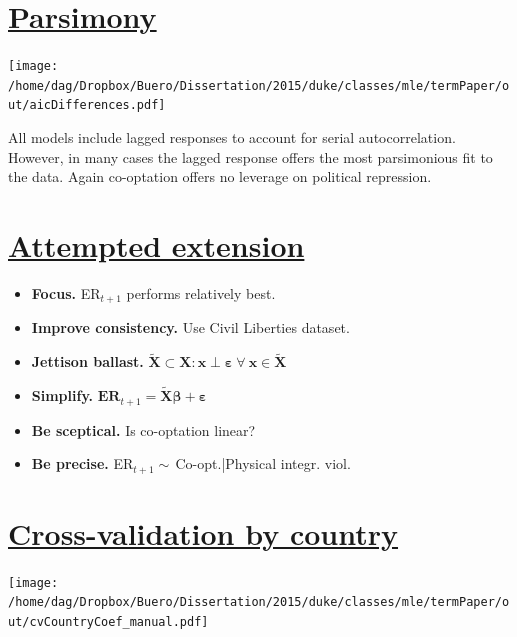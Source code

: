 \documentclass[landscape,paperheight=24in,fontscale=.45,paperwidth=36in]{baposter}
\begin{document}
\begin{poster}
{\begin{minipage}{.49\linewidth}
  \section*{\sf \underline{Parsimony}}
  \texttt{[image: /home/dag/Dropbox/Buero/Dissertation/2015/duke/classes/mle/termPaper/out/aicDifferences.pdf]} \\
  \raggedright
  All models include lagged responses to account for serial 
  autocorrelation. However, in many cases the lagged response 
  offers the most parsimonious fit to the data. Again co-optation
  offers no leverage on political repression. \newline
\end{minipage}
\vfill
\begin{minipage}{.49\linewidth}
  \centering
  \section*{\sf \underline{Attempted extension}}
  \raggedright
  \begin{itemize}
    \item {\bf Focus.} ER$_{t+1}$ performs relatively best.
    \item {\bf Improve consistency.} Use Civil Liberties dataset. 
    \item {\bf Jettison ballast.} $\boldsymbol{\tilde{X}} \subset \boldsymbol{X}: \boldsymbol{x} \perp \boldsymbol{\varepsilon}~\forall~\boldsymbol{x} \in  \boldsymbol{\tilde{X}}$ 
    \item {\bf Simplify.} $\textbf{ER}_{t+1}=\boldsymbol{\tilde{X}\beta}+\boldsymbol{\varepsilon}$
    \item {\bf Be sceptical.} Is co-optation linear?
    \item {\bf Be precise.} ER$_{t+1}\sim$\,Co-opt.|Physical integr. viol.
    \vspace{2.7em}
  \end{itemize}
\end{minipage}
\hfill
\begin{minipage}{.49\linewidth}
  \bigskip
  \centering
  \section*{\sf \underline{Cross-validation by country}}
  \texttt{[image: /home/dag/Dropbox/Buero/Dissertation/2015/duke/classes/mle/termPaper/out/cvCountryCoef\_manual.pdf]} \\
  \raggedright
\end{minipage}

}
\end{poster}
\end{document}

